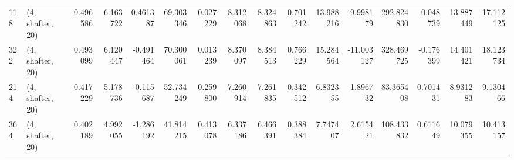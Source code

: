 \begin{tabular}{llrrrrrrrrrrrrrr}
118 &  (4, shafter, 20) &   0.496586 &   6.163722 &   0.461387 &    69.303346 &   0.027229 &   8.312068 &   8.324863 &  0.701242 &  13.988216 &  -9.998179 &   292.824830 & -0.048739 &  13.887449 &  17.112125 \\
322 &  (4, shafter, 20) &   0.493099 &   6.120447 &  -0.491464 &    70.300061 &   0.013239 &   8.370097 &   8.384513 &  0.766229 &  15.284564 & -11.003127 &   328.469725 & -0.176399 &  14.401421 &  18.123734 \\
214 &  (4, shafter, 20) &   0.417229 &   5.178736 &  -0.115687 &    52.734249 &   0.259800 &   7.260914 &   7.261835 &  0.342512 &   6.832355 &   1.896732 &    83.365408 &  0.701431 &   8.931283 &   9.130466 \\
364 &  (4, shafter, 20) &   0.402189 &   4.992055 &  -1.286192 &    41.814215 &   0.413078 &   6.337186 &   6.466391 &  0.388384 &   7.747407 &   2.615421 &   108.433832 &  0.611649 &  10.079355 &  10.413157 \\
\bottomrule
\end{tabular}
